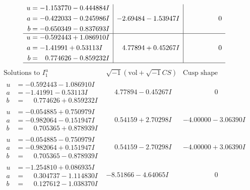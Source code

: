 \documentclass[1p]{elsarticle_modified}
\theoremstyle{definition}
\newcommand{\I}{\sqrt{-1}}
\begin{document}
$$\begin{array}{c|c|c}
\begin{aligned}
u &= -1.153770 - 0.444884 I \\
a &= -0.422033 - 0.245986 I \\
b &= -0.650349 - 0.837693 I\end{aligned}
 & -2.69484 - 1.53947 I & \phantom{-0.000000 } 0 \\ \hline\begin{aligned}
u &= -0.592443 + 1.086910 I \\
a &= -1.41991 + 0.53113 I \\
b &= \phantom{-}0.774626 - 0.859232 I\end{aligned}
 & \phantom{-}4.77894 + 0.45267 I & \phantom{-0.000000 } 0\\
 \hline 
 \end{array}$$\newpage$$\begin{array}{c|c|c}  
\text{Solutions to }I^u_{1}& \I (\text{vol} + \sqrt{-1}CS) & \text{Cusp shape}\\
 \hline 
\begin{aligned}
u &= -0.592443 - 1.086910 I \\
a &= -1.41991 - 0.53113 I \\
b &= \phantom{-}0.774626 + 0.859232 I\end{aligned}
 & \phantom{-}4.77894 - 0.45267 I & \phantom{-0.000000 } 0 \\ \hline\begin{aligned}
u &= -0.054885 + 0.750979 I \\
a &= -0.982064 - 0.151947 I \\
b &= \phantom{-}0.705365 + 0.878939 I\end{aligned}
 & \phantom{-}0.54159 + 2.70298 I & -4.00000 - 3.06390 I \\ \hline\begin{aligned}
u &= -0.054885 - 0.750979 I \\
a &= -0.982064 + 0.151947 I \\
b &= \phantom{-}0.705365 - 0.878939 I\end{aligned}
 & \phantom{-}0.54159 - 2.70298 I & -4.00000 + 3.06390 I \\ \hline\begin{aligned}
u &= -1.254810 + 0.086935 I \\
a &= \phantom{-}0.304737 - 1.114830 I \\
b &= \phantom{-}0.127612 - 1.038370 I\end{aligned}
 & -8.51866 - 4.64065 I & \phantom{-0.000000 } 0 \\ \hline\begin{aligned}

\end{aligned}
\end{array}$$
\end{document}
